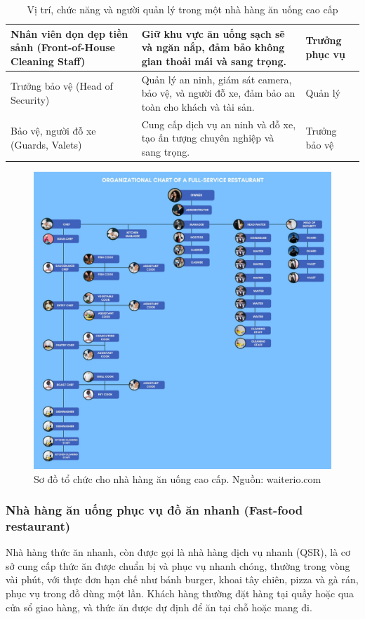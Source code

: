 \begin{table}[ht]
{\begin{tabular}{| p{4cm} | p{11cm} | p{3cm} |}
    \hline
    Nhân viên dọn dẹp tiền sảnh (Front-of-House Cleaning Staff) & Giữ khu vực ăn uống sạch sẽ và ngăn nắp, đảm bảo không gian thoải mái và sang trọng. & Trưởng phục vụ \\
    \hline
    Trưởng bảo vệ (Head of Security) & Quản lý an ninh, giám sát camera, bảo vệ, và người đỗ xe, đảm bảo an toàn cho khách và tài sản. & Quản lý \\
    \hline
    Bảo vệ, người đỗ xe (Guards, Valets) & Cung cấp dịch vụ an ninh và đỗ xe, tạo ấn tượng chuyên nghiệp và sang trọng. & Trưởng bảo vệ \\
    \hline
    \end{tabular}
}
\caption{Vị trí, chức năng và người quản lý trong một nhà hàng ăn uống cao cấp}
\end{table}

\clearpage

\begin{figure}[H]
    \centering
    \includegraphics[width=15cm]{Images/finedining_orig_chart.jpg}
    \vspace{0.5cm}
    \caption{Sơ đồ tổ chức cho nhà hàng ăn uống cao cấp. Nguồn: waiterio.com}
\end{figure}

\subsubsection{Nhà hàng ăn uống phục vụ đồ ăn nhanh (Fast-food restaurant)}
Nhà hàng thức ăn nhanh, còn được gọi là nhà hàng dịch vụ nhanh (QSR), là cơ sở cung cấp thức ăn được chuẩn bị và phục vụ nhanh chóng, thường trong vòng vài phút, với thực đơn hạn chế như bánh burger, khoai tây chiên, pizza và gà rán, phục vụ trong đồ dùng một lần. Khách hàng thường đặt hàng tại quầy hoặc qua cửa sổ giao hàng, và thức ăn được dự định để ăn tại chỗ hoặc mang đi. \\


